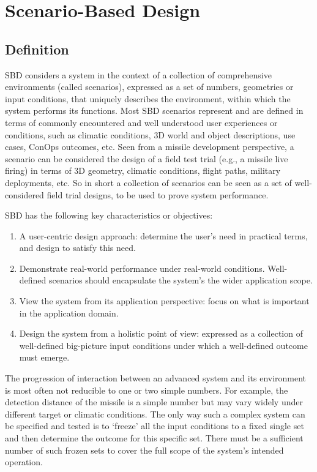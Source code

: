 \chapter{Scenario-Based Design}

\section{Definition}

\ac{SBD} considers a system in the context of a collection of comprehensive environments (called scenarios), expressed as a set of numbers, geometries or input conditions, that uniquely describes the environment, within which the system performs its functions.
Most \ac{SBD} scenarios represent and are defined in terms of commonly encountered and well understood user experiences or conditions, such as climatic conditions, \ac{3D} world and object descriptions, use cases, \ac{ConOps} outcomes, etc.
Seen from a missile development perspective, a scenario can be considered the design of a field test trial (e.g., a missile live firing) in terms of \ac{3D} geometry, climatic conditions, flight paths, military deployments, etc.
So in short a collection of scenarios can be seen as a set of well-considered field trial designs, to be used to prove system performance.

\ac{SBD} has the following key characteristics or objectives:
\begin{enumerate}

\item A user-centric design approach: determine the user's need in practical terms, and design to satisfy this need.
    
\item Demonstrate real-world performance under real-world conditions. Well-defined scenarios should encapsulate the system's the wider application scope. 

\item View the system from its application perspective: focus on what is important in the application domain.

\item Design the system from a holistic point of view: expressed as a collection of well-defined big-picture input conditions under which a well-defined outcome must emerge.

\end{enumerate}


The progression of interaction between an advanced system and its environment is most often not reducible to one or two simple numbers. For example, the detection distance of the missile is a simple number but may vary widely under different target or climatic conditions.  The only way such a complex system can be specified and tested is to `freeze' all the input conditions to a fixed single set and then determine the outcome for this specific set.  There must be a sufficient number of such frozen sets to cover the full scope of the system's intended operation. 

\section{}